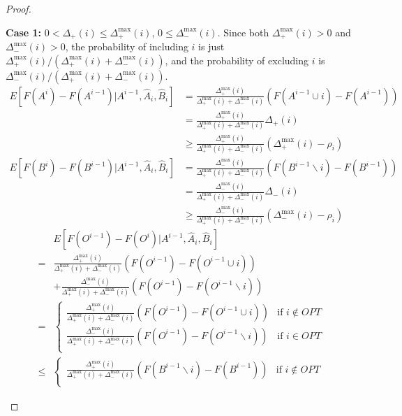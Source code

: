 \begin{proof}
\begin{description}
\item\textbf{Case 1:} $0 < \Delta_+(i) \leq \Delta_+^{\max}(i)$, $0 \leq \Delta_-^{\max}(i)$.
Since both $\Delta_+^{\max}(i)>0$ and $\Delta_-^{\max}(i)>0$, the probability of including $i$ is just $\Delta_+^{\max}(i) / (\Delta_+^{\max}(i) + \Delta_-^{\max}(i))$, and the probability of excluding $i$ is $\Delta_-^{\max}(i) / (\Delta_+^{\max}(i) + \Delta_-^{\max}(i))$.
\begin{align*}
E[F(A^i) - F(A^{i-1}) | A^{i-1}, \hat{A}_i, \hat{B}_i]
&= \frac{\Delta_+^{\max}(i)}{\Delta_+^{\max}(i) + \Delta_-^{\max}(i)} (F(A^{i-1}\cup i) - F(A^{i-1}))\\
&= \frac{\Delta_+^{\max}(i)}{\Delta_+^{\max}(i) + \Delta_-^{\max}(i)} \Delta_+(i)\\
&\geq \frac{\Delta_+^{\max}(i)}{\Delta_+^{\max}(i) + \Delta_-^{\max}(i)} (\Delta_+^{\max}(i) - \rho_i)\\
E[F(B^i) - F(B^{i-1}) | A^{i-1}, \hat{A}_i, \hat{B}_i]
&= \frac{\Delta_-^{\max}(i)}{\Delta_+^{\max}(i) + \Delta_-^{\max}(i)} (F(B^{i-1}\backslash i) - F(B^{i-1}))\\
&= \frac{\Delta_-^{\max}(i)}{\Delta_+^{\max}(i) + \Delta_-^{\max}(i)} \Delta_-(i)\\
&\geq \frac{\Delta_-^{\max}(i)}{\Delta_+^{\max}(i) + \Delta_-^{\max}(i)} (\Delta_-^{\max}(i) - \rho_i)
\end{align*}
\begin{align*}
&E[F(O^{i-1}) - F(O^i) | A^{i-1}, \hat{A}_i, \hat{B}_i]\\
=&   \frac{\Delta_+^{\max}(i)}{\Delta_+^{\max}(i) + \Delta_-^{\max}(i)} (F(O^{i-1}) - F(O^{i-1} \cup i)) \\
 & + \frac{\Delta_-^{\max}(i)}{\Delta_+^{\max}(i) + \Delta_-^{\max}(i)} (F(O^{i-1}) - F(O^{i-1} \backslash i)) \\
=&\begin{cases}
    \frac{\Delta_+^{\max}(i)}{\Delta_+^{\max}(i) + \Delta_-^{\max}(i)} (F(O^{i-1}) - F(O^{i-1} \cup i))       & \text{if $i\not\in OPT$}\\
    \frac{\Delta_-^{\max}(i)}{\Delta_+^{\max}(i) + \Delta_-^{\max}(i)} (F(O^{i-1}) - F(O^{i-1} \backslash i)) & \text{if $i    \in OPT$}\\
\end{cases}\\
\leq&\begin{cases}
    \frac{\Delta_+^{\max}(i)}{\Delta_+^{\max}(i) + \Delta_-^{\max}(i)} (F(B^{i-1}\backslash i) - F(B^{i-1})) & \text{if $i\not\in OPT$}\\

\end{cases}
\end{align*}
\end{description}
\end{proof}
